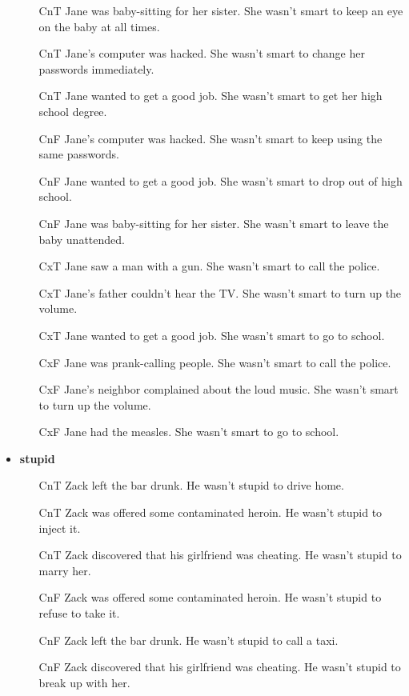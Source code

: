 \documentclass[11pt,fleqn]{article}
\newcommand{\6}{\mbox{$[\hspace*{-.6mm}[$}}
\newcommand{\9}{\mbox{$]\hspace*{-.6mm}]$}}
\begin{document}
\begin{itemize}[itemsep=-1pt]
\begin{enumerate}[topsep=0pt,itemsep=-4pt]
\item[CnT] 	Jane was baby-sitting for her sister.	She	wasn't smart	to keep an eye on the baby at all times.
\item[CnT] 	Jane's computer was hacked.	She	wasn't smart	to change her passwords immediately.
\item[CnT] 	Jane wanted to get a good job.	She	wasn't smart	to get her high school degree.
\item[CnF] 	Jane's computer was hacked.	She	wasn't smart	to keep using the same passwords.
\item[CnF] 	Jane wanted to get a good job.	She	wasn't smart	to drop out of high school.
\item[CnF] 	Jane was baby-sitting for her sister.	She	wasn't smart	to leave the baby unattended.
\item[CxT] 	Jane saw a man with a gun.	She	wasn't smart	to call the police.
\item[CxT] 	Jane's father couldn't hear the TV.	She	wasn't smart	to turn up the volume.
\item[CxT] 	Jane wanted to get a good job.	She	wasn't smart	to go to school.
\item[CxF] 	Jane was prank-calling people.	She	wasn't smart	to call the police.
\item[CxF] 	Jane's neighbor complained about the loud music.	She	wasn't smart	to turn up the volume.
\item[CxF] 	Jane had the measles.	She	wasn't smart	to go to school.


\end{enumerate}


\item {\bf stupid}

\begin{enumerate}[topsep=0pt,itemsep=-4pt]

\item[CnT] 	Zack left the bar drunk.	He	wasn't stupid	to drive home.
\item[CnT] 	Zack was offered some contaminated heroin.	He	wasn't stupid	to inject it.
\item[CnT] 	Zack discovered that his girlfriend was cheating.	He	wasn't stupid	to marry her.
\item[CnF] 	Zack was offered some contaminated heroin.	He	wasn't stupid	to refuse to take it.
\item[CnF] 	Zack left the bar drunk.	He	wasn't stupid	to call a taxi.
\item[CnF] 	Zack discovered that his girlfriend was cheating.	He	wasn't stupid	to break up with her.


\end{enumerate}
\end{itemize}
\end{document}
